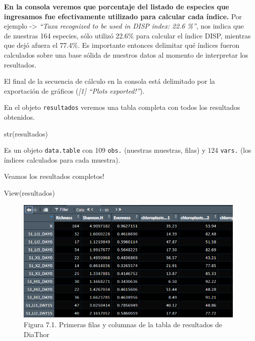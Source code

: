 \documentclass[
]{book}
\newenvironment{Shaded}{\begin{snugshade}}{\end{snugshade}}
\newcommand{\FunctionTok}[1]{\textcolor[rgb]{0.00,0.00,0.00}{#1}}
\newcommand{\NormalTok}[1]{#1}
\begin{document}
\textbf{En la consola veremos que porcentaje del listado de especies que ingresamos fue efectivamente utilizado para calcular cada índice.} Por ejemplo -\textgreater{} \emph{``Taxa recognized to be used in DISP index: 22.6 \%''}, nos indica que de nuestras 164 especies, sólo utilizó 22.6\% para calcular el índice DISP, mientras que dejó afuera el 77.4\%. Es importante entonces delimitar qué índices fueron calculados sobre una base sólida de nuestros datos al momento de interpretar los resultados.

El final de la secuencia de cálculo en la consola está delimitado por la exportación de gráficos (\emph{{[}1{]} ``Plots exported!''}).

En el objeto \texttt{resultados} veremos una tabla completa con todos los resultados obtenidos.

\begin{Shaded}
\begin{Highlighting}[]
\FunctionTok{str}\NormalTok{(resultados)}
\end{Highlighting}
\end{Shaded}

Es un objeto \texttt{data.table} con 109 \texttt{obs.} (nuestras muestras, filas) y 124 \texttt{vars.} (los índices calculados para cada muestra).

Veamos los resultados completos!

\begin{Shaded}
\begin{Highlighting}[]
\FunctionTok{View}\NormalTok{(resultados)}
\end{Highlighting}
\end{Shaded}

\begin{figure}
\centering
\includegraphics{./images/results_diathor.png}
\caption{Figura 7.1. Primeras filas y columnas de la tabla de resultados de DiaThor}
\end{figure}
\end{document}
